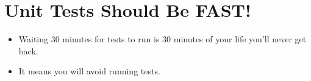 \documentclass{article}
\begin{document}
\sloppy
\section{Unit Tests Should Be FAST!}
\begin{itemize}
    \item Waiting 30 minutes for tests to run is 30 minutes of your life you'll
        never get back.
    \item It means you will avoid running tests.
\end{itemize}
\end{document}
